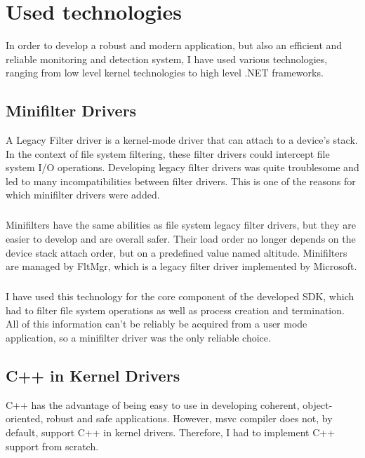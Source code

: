 \chapter{Used technologies}
    In order to develop a robust and modern application, but also an efficient and reliable monitoring and detection system, I have used various
    technologies, ranging from low level kernel technologies to high level .NET frameworks.

    \section{Minifilter Drivers}
        A Legacy Filter driver is a kernel-mode driver that can attach to a device's stack. In the context of file system filtering, these
        filter drivers could intercept file system I/O operations. Developing legacy filter drivers was quite troublesome and led to 
        many incompatibilities between filter drivers. This is one of the reasons for which minifilter drivers were added.
        
        \paragraph{}
        Minifilters have the same abilities as file system legacy filter drivers, but they are easier to develop and are overall safer. Their
        load order no longer depends on the device stack attach order, but on a predefined value named altitude. Minifilters are managed by
        FltMgr, which is a legacy filter driver implemented by Microsoft.

        \paragraph{}
        I have used this technology for the core component of the developed SDK, which had to filter file system operations as well
        as process creation and termination. All of this information can't be reliably be acquired from a user mode application, so a minifilter
        driver was the only reliable choice.

    \section{C++ in Kernel Drivers}
        C++ has the advantage of being easy to use in developing coherent, object-oriented, robust and safe applications. However, msvc compiler
        does not, by default, support C++ in kernel drivers. Therefore, I had to implement C++ support from scratch.

